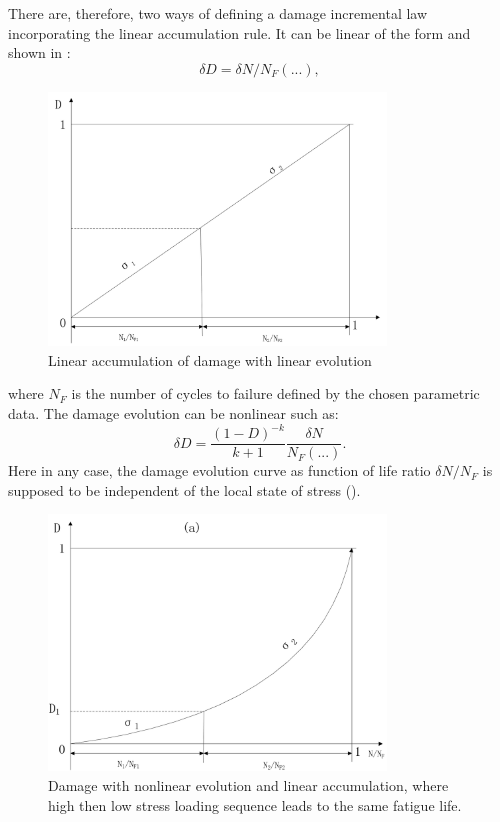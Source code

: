 There are, therefore, two ways of defining a damage incremental law incorporating the linear accumulation rule. It can be linear of the form and shown in :
$$\delta D= \delta N/N_F(...),$$
\begin{figure}[!h]
	\centering
	\includegraphics[width=0.8\textwidth]{figures//linearevolution.png} 
	\caption{Linear accumulation of damage with linear evolution}
	\label{linearevolution}
\end{figure}
where $N_F$ is the number of cycles to failure defined by the chosen parametric data.
The damage evolution can be nonlinear such as:
$$\delta D= \frac{(1-D)^{-k}}{k+1}\frac{\delta N}{N_F(...)}.$$
Here in any case, the damage evolution curve as function of life ratio $\delta N/N_F$ is supposed to be independent of the local state of stress ().
\begin{figure}[!h]
	\centering
	\includegraphics[width=0.8\textwidth]{figures//linearaccumulation.png} 
	\caption{Damage with nonlinear evolution and linear accumulation, where high then low stress loading sequence leads to the same fatigue life.}
	\label{linear accumulation}
\end{figure}
